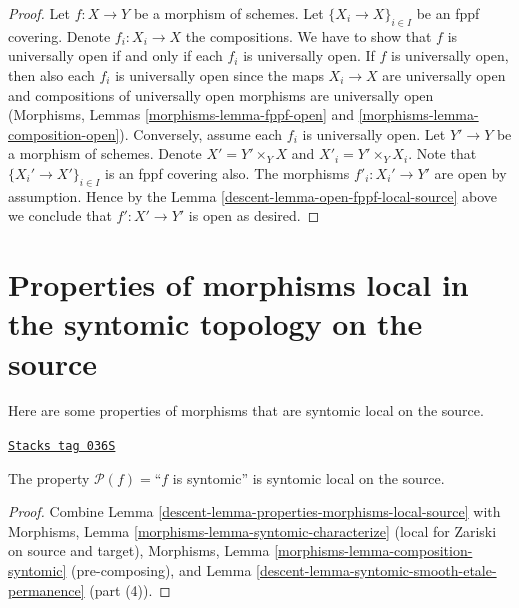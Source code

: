 \begin{proof}

Let $f : X \to Y$ be a morphism of schemes.
Let $\{X_i \to X\}_{i \in I}$ be an fppf covering.
Denote $f_i : X_i \to X$ the compositions.
We have to show that $f$ is universally open if and only if
each $f_i$ is universally open. If $f$ is universally open,
then also each $f_i$ is universally open since the maps
$X_i \to X$ are universally open and compositions
of universally open morphisms are universally open
(Morphisms, Lemmas \ref{morphisms-lemma-fppf-open}
and \ref{morphisms-lemma-composition-open}).
Conversely, assume each $f_i$ is universally open.
Let $Y' \to Y$ be a morphism of schemes.
Denote $X' = Y' \times_Y X$ and $X'_i = Y' \times_Y X_i$.
Note that $\{X_i' \to X'\}_{i \in I}$ is an fppf covering also.
The morphisms $f'_i : X_i' \to Y'$ are open by assumption.
Hence by the Lemma \ref{descent-lemma-open-fppf-local-source}
above we conclude that $f' : X' \to Y'$ is open as desired.
\end{proof}

\section{Properties of morphisms local in the syntomic topology on the source}
\label{descent-section-syntomic-local-source}
Here are some properties of morphisms that are syntomic local on the source.

\begin{lemma}
\label{descent-lemma-syntomic-syntomic-local-source}
\href{https://stacks.math.columbia.edu/tag/036S}{\texttt{Stacks tag 036S}}

The property $\mathcal{P}(f)=$``$f$ is syntomic''
is syntomic local on the source.
\end{lemma}

\begin{proof}

Combine Lemma \ref{descent-lemma-properties-morphisms-local-source} with
Morphisms, Lemma \ref{morphisms-lemma-syntomic-characterize}
(local for Zariski on source and target),
Morphisms, Lemma \ref{morphisms-lemma-composition-syntomic} (pre-composing),
and Lemma \ref{descent-lemma-syntomic-smooth-etale-permanence} (part (4)).
\end{proof}

